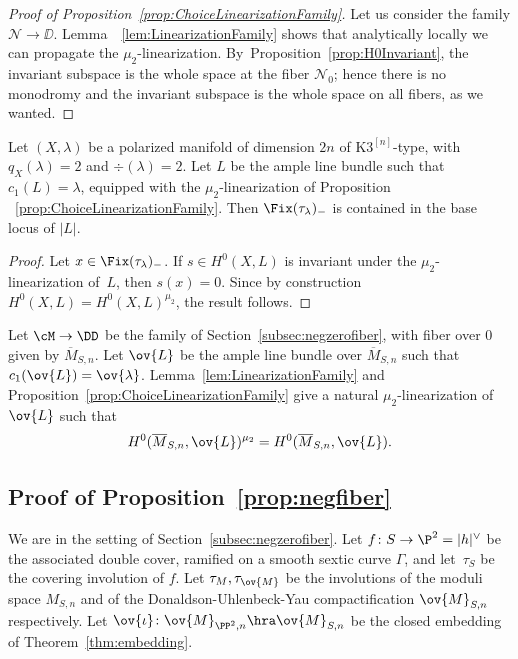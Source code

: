 \begin{proof}[Proof of Proposition~\ref{prop:ChoiceLinearizationFamily}]
Let us consider the family $\mathcal{N}\to\DD$.
Lemma~~\ref{lem:LinearizationFamily} shows that analytically locally we can propagate the $\mu_2$-linearization. By~Proposition~\ref{prop:H0Invariant}, the invariant subspace is the whole space at the fiber $\mathcal{N}_0$; hence there is no monodromy and the invariant subspace is the whole space on all fibers, as we wanted.
\end{proof}

\begin{coro}\label{coro:negbase}
Let $(X,\lambda)$ be a polarized \HK manifold of dimension $2n$ of $\mathrm{K3}^{[n]}$-type, with $q_X(\lambda)=2$ and $\div(\lambda)=2$.
Let $L$ be the ample line bundle such that $c_1(L)=\lambda$, equipped with the $\mu_2$-linearization of Proposition ~\ref{prop:ChoiceLinearizationFamily}.
Then $\Fix(\tau_{\lambda})_{-}$ is contained in the base locus of $|L|$.
\end{coro}

\begin{proof}
Let $x\in\Fix(\tau_{\lambda})_{-}$. If $s\in H^0(X,L)$ is invariant under the $\mu_2$-linearization of~$L$, then $s(x)=0$.
Since by construction $H^0(X,L)=H^0(X,L)^{\mu_2}$, the result follows.
\end{proof}

Let $\cM\to\DD$ be the family of Section~\ref{subsec:negzerofiber}, with fiber over $0$ given by $\overline{M}_{S,n}$. Let $\ov{L}$ be the ample line bundle over $\overline{M}_{S,n}$ such that $c_1(\ov{L})=\ov{\lambda}$.
Lemma~\ref{lem:LinearizationFamily} and Proposition~\ref{prop:ChoiceLinearizationFamily} give a natural $\mu_2$-linearization of $\ov{L}$ such that
\[
H^0(\overline{M}_{S,n},\ov{L})^{\mu_2} = H^0(\overline{M}_{S,n},\ov{L}).
\]

\subsection{Proof of Proposition~\ref{prop:negfiber}}\label{subsec:LinearizationDegree2}

We are in the setting of Section~\ref{subsec:negzerofiber}.
Let $f\colon S\to \P^2=|h|^{\vee}$ be the associated double cover, ramified on a smooth sextic curve $\mathsf{\Gamma}$, and let~$\tau_S$ be the covering involution of $f$.
Let $\tau_M,\tau_{\ov{M}}$ be the involutions of the moduli space $M_{S,n}$ and of the Donaldson-Uhlenbeck-Yau compactification $\ov{M}_{S,n}$ respectively. Let $\ov{\iota}\colon \ov{M}_{\PP^2,n}\hra \ov{M}_{S,n}$ be the closed embedding of Theorem~\ref{thm:embedding}.

